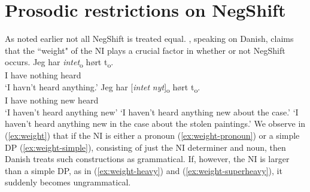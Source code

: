 \documentclass[12pt, letterpaper]{article}
\begin{document}
\section{Prosodic restrictions on NegShift} \label{sec:PROSODY}

As noted earlier not all NegShift is treated equal. \citet[65f]{christensenInterfacesNegationSyntax2005}, speaking on Danish, claims that the ``weight" of the NI plays a crucial factor in whether or not NegShift occurs. 
	\ea \label{ex:weight}
		\ea \label{ex:weight-pronoun}
		\gll Jeg har \textit{intet}\textsubscript{o} hørt t\textsubscript{o}.\\
		I have nothing heard\\
		\glt  `I havn't heard anything.'
		\ex \label{ex:weight-simple}
		\gll Jeg har [\textit{intet} \textit{nyt}]\textsubscript{o} hørt t\textsubscript{o}.\\
		I have nothing new heard\\
		\glt `I haven't heard anything new'
		\glt `I haven't heard anything new about the case.' \label{ex:weight-heavy}
		\glt `I haven't heard anything new in the case about the stolen paintings.' \label{ex:weight-superheavy}
		\z 
	\z
We observe in (\ref{ex:weight}) that if the NI is either a pronoun (\ref{ex:weight-pronoun}) or a simple DP (\ref{ex:weight-simple}), consisting of just the NI determiner and noun, then Danish treats such constructions as grammatical. If, however, the NI is larger than a simple DP, as in (\ref{ex:weight-heavy}) and (\ref{ex:weight-superheavy}), it suddenly becomes ungrammatical. 
\end{document}
